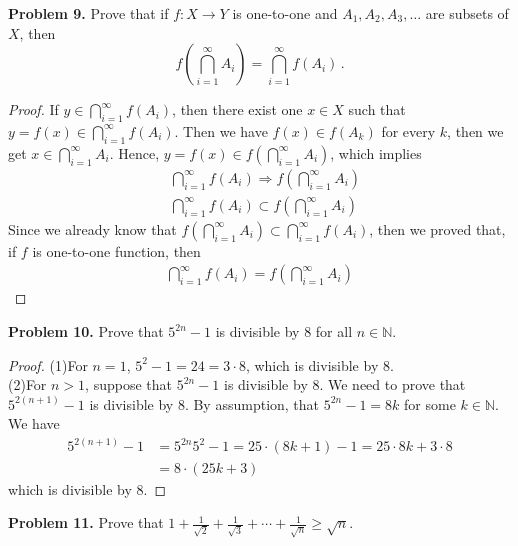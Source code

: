 \documentclass[12pt,leqno]{amsart}
\begin{document}
\medskip


\noindent
{\bf Problem 9.}
{ Prove that if $f:X\to Y$ is one-to-one and $A_1,A_2,A_3,\ldots$ are subsets of $X$, then
$$
f\left(\bigcap_{i=1}^\infty A_i\right) =
\bigcap_{i=1}^\infty f(A_i)\, .
$$}
\begin{proof}
If $y \in \bigcap_{i=1}^\infty f(A_i)$, then there exist one $x \in X$ such that $y = f(x) \in \bigcap_{i=1}^\infty f(A_i)$. Then we have $f(x) \in f(A_k)$ for every $k$, then we get $x \in \bigcap_{i=1}^\infty A_i$. Hence, $y = f(x) \in f\left(\bigcap_{i=1}^\infty A_i\right)$, which implies
\begin{align*}
    & \bigcap_{i=1}^\infty f(A_i) \Rightarrow f\left(\bigcap_{i=1}^\infty A_i\right) \\
    & \bigcap_{i=1}^\infty f(A_i) \subset f\left(\bigcap_{i=1}^\infty A_i\right)
\end{align*}
Since we already know that $f\left(\bigcap_{i=1}^\infty A_i\right) \subset \bigcap_{i=1}^\infty f(A_i)$, then we proved that, if $f$ is one-to-one function, then 
\begin{align*}
    \bigcap_{i=1}^\infty f(A_i) = f\left(\bigcap_{i=1}^\infty A_i\right)
\end{align*}
\end{proof}

\medskip

\noindent
{\bf Problem 10.}
{ Prove that $5^{2n}-1$ is divisible by $8$ for all $n\in \mathbb{N}$.}
\begin{proof}
(1)For $n = 1$, $5^2 - 1 = 24 = 3 \cdot 8$, which is divisible by $8$.\\
\hspace*{2em}(2)For $n > 1$, suppose that $5^{2n}-1$ is divisible by $8$. We need to prove that $5^{2(n+1)}-1$ is divisible by $8$. By assumption, that $5^{2n}-1 = 8k$ for some $k \in \mathbb{N}$. We have
\begin{align*}
    5^{2(n+1)}-1 & = 5^{2n}5^2 - 1 = 25 \cdot (8k + 1) - 1 = 25 \cdot 8k + 3 \cdot 8 \\
    & = 8 \cdot (25 k + 3)
\end{align*}
which is divisible by $8$.
\end{proof}


\noindent
{\bf Problem 11.}
{ Prove that
$\displaystyle
1 + \frac{1}{\sqrt{2}} + \frac{1}{\sqrt{3}} + \cdots + \frac{1}{\sqrt{n}}
\geq \sqrt{n}.
$}
\end{document}
